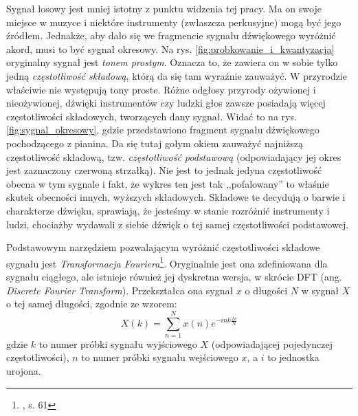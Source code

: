 Sygnał losowy jest mniej istotny z punktu widzenia tej pracy. Ma on swoje miejsce w muzyce i niektóre instrumenty (zwłaszcza perkusyjne) mogą być jego źródłem. Jednakże, aby dało się we fragmencie sygnału dźwiękowego wyróżnić akord, musi to być sygnał okresowy. Na rys. \ref{fig:probkowanie_i_kwantyzacja} oryginalny sygnał jest \emph{tonem prostym}. Oznacza to, że zawiera on w sobie tylko jedną \emph{częstotliwość składową}, którą da się tam wyraźnie zauważyć. W przyrodzie właściwie nie występują tony proste. Różne odgłosy przyrody ożywionej i nieożywionej, dźwięki instrumentów czy ludzki głos zawsze posiadają więcej częstotliwości składowych, tworzących dany sygnał. Widać to na rys. \ref{fig:sygnal_okresowy}, gdzie przedstawiono fragment sygnału dźwiękowego pochodzącego z pianina. Da się tutaj gołym okiem zauważyć najniższą częstotliwość składową, tzw. \emph{częstotliwość podstawową} (odpowiadający jej okres jest zaznaczony czerwoną strzałką). Nie jest to jednak jedyna częstotliwość obecna w tym sygnale i fakt, że wykres ten jest tak ,,pofalowany'' to właśnie skutek obecności innych, wyższych składowych. Składowe te decydują o barwie i charakterze dźwięku, sprawiają, że jesteśmy w stanie rozróżnić instrumenty i ludzi, chociażby wydawali z siebie dźwięk o tej samej częstotliwości podstawowej. 

Podstawowym narzędziem pozwalającym wyróżnić częstotliwości składowe sygnału jest \emph{Transformacja Fouriera}\footnote{\cite{lyons_wprowadzenie_2000}, s. 61}. Oryginalnie jest ona zdefiniowana dla sygnału ciągłego, ale istnieje również jej dyskretna wersja, w skrócie DFT (ang. \emph{Discrete Fourier Transform}).  Przekształca ona sygnał $x$ o długości $N$ w sygnał $X$ o tej samej długości, zgodnie ze wzorem:
\begin{equation} \label{eq:dft}
    X(k) = \sum_{n=1}^{N} x(n) e^{-ink \frac{2 \pi}{N}}
\end{equation}
gdzie $k$ to numer próbki sygnału wyjściowego $X$ (odpowiadającej pojedynczej częstotliwości), $n$ to numer próbki sygnału wejściowego $x$, a $i$ to jednostka urojona.

